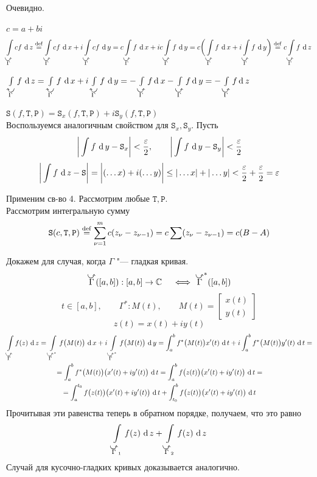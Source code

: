 \begin{eproof}
	\item Очевидно.

	\item $ c = a + bi $
	$$ \cint[z]{\curvedir\Gamma}{cf} \bydef \cint[x]{\curvedir\Gamma}{cf} + i \cint[y]{\curvedir\Gamma}{cf} = c \cint[x]{\curvedir\Gamma}f + ic \cint[y]{\curvedir\Gamma}f = c \bigg( \cint[x]{\curvedir\Gamma}f + i \cint[y]{\curvedir\Gamma}f \bigg) \bydef c \cint[z]{\curvedir\Gamma}f $$

	\item $ \cint[z]{\curvedir[0]\Gamma}f = \cint[x]{\curvedir[0]\Gamma}f + i \cint[y]{\curvedir[0]\Gamma}f = -\int\limits_{\curvedir \Gamma} f \di x - \int\limits_{\curvedir \Gamma} f \di y = -\int\limits_{\curvedir \Gamma} f \di z $

	\item $ \mathtt S(f, \mathtt T, \mathtt P) = \mathtt S_x(f, \mathtt T, \mathtt P) + i \mathtt S_y(f, \mathtt T, \mathtt P) $ \\
	Воспользуемся аналогичным свойством для $ \mathtt S_x, \mathtt S_y $. Пусть
	$$ \bigg| \sint[y]f - \mathtt S_x \bigg| < \frac\eps2, \qquad \bigg| \sint[y]f - \mathtt S_y \bigg| < \frac\eps2 $$
	$$ \bigg| \sint[z]f - \mathtt S \bigg| = \bigg| (\dots x) + i(\dots y) \bigg| \le |\dots x| + |\dots y| < \frac\eps2 + \frac\eps2 = \eps $$

	\item Применим св-во 4. Рассмотрим любые $ \mathtt T, \mathtt P $. \\
	Рассмотрим интегральную сумму
	$$ \mathtt S(c, \mathtt T, \mathtt P) \bydef \sum_{\nu = 1}^m c(z_\nu - z_{\nu - 1}) = c \sum (z_\nu - z_{\nu - 1}) = c(B - A) $$

	\item Докажем для случая, когда $ \Gamma $ "--- гладкая кривая.
	$$ \curvedir\Gamma([a, b]) : [a, b] \to \Co \quad \iff \curvedir\Gamma^*([a, b]) $$
	$$ t \in [a, b], \qquad \Gamma^* : M(t), \qquad M(t) =
	\begin{bmatrix}
		x(t) \\
		y(t)
	\end{bmatrix} $$
	$$ z(t) = x(t) + iy(t) $$
	\begin{multline*}
		\cint[z]{\curvedir \Gamma}{f(z)} = \cint[x]{\curvedir\Gamma^*}{f \big( M(t) \big)} + i \cint[y]{\curvedir\Gamma^*}{f \big( M(t) \big)} = \dint[t]ab{ f^* \big( M(t) \big)x'(t)} + i \dint[t]ab{f^* \big( M(t) \big) y'(t)} = \\
		= \dint[t]ab{ f^* \big( M(t) \big) \big( x'(t) + iy'(t) \big)} = \dint[t]ab{f \big( z(t) \big) \big( x'(t) + iy'(t) \big)} = \\
		= \dint[t]a{t_0}{ f \big( z(t) \big) \big( x'(t) + iy'(t) \big)} + \dint[t]{t_0}b{ f \big( z(t) \big) \big( x'(t) + iy'(t) \big)}
	\end{multline*}
	Прочитывая эти равенства теперь в обратном порядке, получаем, что это равно
	$$ \cint[z]{\curvedir\Gamma_1}{f(z)} + \cint[z]{\curvedir\Gamma_2}{f(z)} $$
	Случай для кусочно-гладких кривых доказывается аналогично.


\end{eproof}
